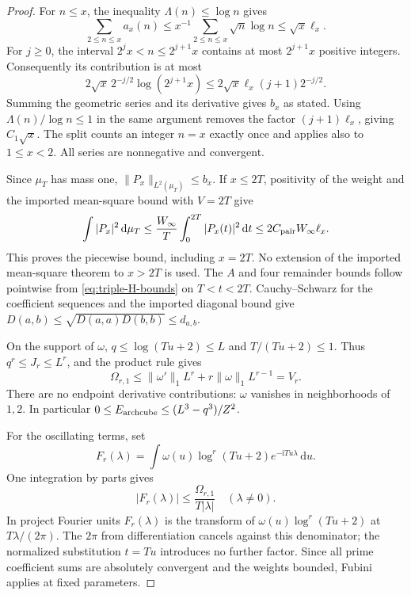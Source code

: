 \documentclass[11pt]{article}
\newcommand{\ii}{\mathrm i}
\newcommand{\dd}{\,\mathrm d}
\begin{document}
\begin{proof}
For \(n\leq x\), the inequality \(\Lambda(n)\leq\log n\) gives
\[
 \sum_{2\leq n\leq x}a_x(n)
 \leq x^{-1}\sum_{2\leq n\leq x}\sqrt n\log n
 \leq\sqrt{x}\ell_x.
\]
For \(j\geq0\), the interval \(2^jx<n\leq2^{j+1}x\) contains at most
\(2^{j+1}x\) positive integers. Consequently its contribution is at most
\[
 2\sqrt{x}\,2^{-j/2}\log(2^{j+1}x)
 \leq2\sqrt{x}\ell_x(j+1)2^{-j/2}.
\]
Summing the geometric series and its derivative gives \(b_x\) as stated.
Using \(\Lambda(n)/\log n\leq1\) in the same argument removes the
factor \((j+1)\ell_x\), giving \(C_1\sqrt{x}\).
The split counts an integer \(n=x\) exactly once and applies also to
\(1\leq x<2\). All series are nonnegative and convergent.

Since \(\mu_T\) has mass one, \(\|P_x\|_{L^2(\mu_T)}\leq b_x\).
If \(x\leq2T\), positivity of the weight and the imported mean-square bound
with \(V=2T\) give
\[
 \int|P_x|^2\dd\mu_T
 \leq \frac{W_\infty}{T}\int_0^{2T}|P_x(t)|^2\dd t
 \leq2C_{\rm pair}W_\infty\ell_x.
\]
This proves the piecewise bound, including \(x=2T\). No extension of
the imported mean-square theorem to \(x>2T\) is used.
The \(A\) and four remainder bounds follow pointwise from
\eqref{eq:triple-H-bounds} on \(T<t<2T\). Cauchy--Schwarz for the
coefficient sequences and the imported diagonal bound give
\(D(a,b)\leq\sqrt{D(a,a)D(b,b)}\leq d_{a,b}\).

On the support of \(\omega\), \(q\leq\log(Tu+2)\leq L\) and
\(T/(Tu+2)\leq1\). Thus \(q^r\leq J_r\leq L^r\), and the product rule
gives
\[
 \Omega_{r,1}\leq
 \|\omega'\|_1L^r+r\|\omega\|_1L^{r-1}=V_r.
\]
There are no endpoint derivative contributions: \(\omega\) vanishes
in neighborhoods of \(1,2\). In particular
\(0\leq E_{\rm archcube}\leq(L^3-q^3)/Z^2\).

For the oscillating terms, set
\[
 F_r(\lambda)=\int\omega(u)\log^r(Tu+2)e^{-\ii Tu\lambda}\dd u .
\]
One integration by parts gives
\begin{equation}\label{eq:uniform-ibp}
 |F_r(\lambda)|\leq\frac{\Omega_{r,1}}{T|\lambda|}
 \quad(\lambda\ne0).
\end{equation}
In project Fourier units \(F_r(\lambda)\) is the transform of
\(\omega(u)\log^r(Tu+2)\) at \(T\lambda/(2\pi)\).
The \(2\pi\) from differentiation cancels against this denominator;
the normalized substitution \(t=Tu\) introduces no further factor.
Since all prime coefficient sums are absolutely convergent and the
weights bounded, Fubini applies at fixed parameters.


\end{proof}
\end{document}

